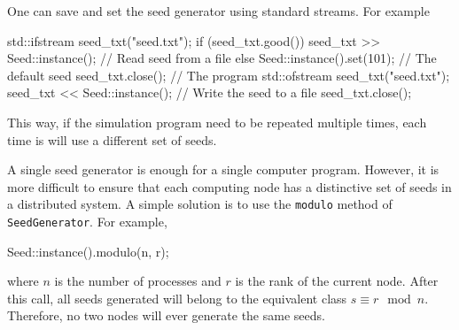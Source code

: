One can save and set the seed generator using standard \cpp streams. For
example
\begin{cppcode}
  std::ifstream seed_txt("seed.txt");
  if (seed_txt.good())
      seed_txt >> Seed::instance(); // Read seed from a file
  else
      Seed::instance().set(101);    // The default seed
  seed_txt.close();
  // The program
  std::ofstream seed_txt("seed.txt");
  seed_txt << Seed::instance();     // Write the seed to a file
  seed_txt.close();
\end{cppcode}
This way, if the simulation program need to be repeated multiple times, each
time is will use a different set of seeds.

A single seed generator is enough for a single computer program. However, it is
more difficult to ensure that each computing node has a distinctive set of
seeds in a distributed system. A simple solution is to use the \verb|modulo|
method of \verb|SeedGenerator|. For example,
\begin{cppcode}
  Seed::instance().modulo(n, r);
\end{cppcode}
where $n$ is the number of processes and $r$ is the rank of the current node.
After this call, all seeds generated will belong to the equivalent class $s
\equiv r\mod{n}$. Therefore, no two nodes will ever generate the same seeds.
